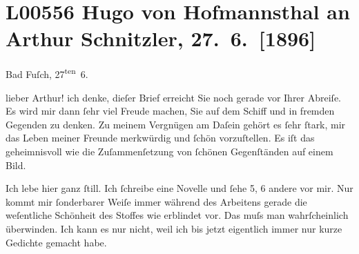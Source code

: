 

\section[Hugo von Hofmannsthal an Arthur Schnitzler, 27. 6. {[}1896{]}]{L00556 Hugo von Hofmannsthal an Arthur Schnitzler, 27. 6. {[}1896{]}}
\nopagebreak{}
\rehead{ }\normalsize\beginnumbering{}
\toendnotes[C]{\smallbreak\pagebreak[2]}
\toendnotes[C]{\smallbreak}
\pstart
           \raggedleft{}{\pb}Bad Fuſch, 27\textsuperscript{ten} 6.\pend
           
\pstart{}lieber Arthur!\pend\vspace{0.5em}
\pstart
           ich denke, dieſer Brief erreicht Sie noch gerade vor Ihrer Abreiſe. Es wird mir dann
               ſehr viel Freude machen, Sie auf dem Schiff und in fremden Gegenden zu denken. Zu
               meinem Vergnügen am Daſein gehört es ſehr ſtark, mir das Leben meiner Freunde
               merkwürdig und ſchön vorzuſtellen. Es iſt das geheimnis{\pb}voll wie die Zuſammenſetzung von
               ſchönen Gegenſtänden auf einem Bild.\pend
           
\pstart
           Ich lebe hier ganz ſtill. Ich ſchreibe eine Novelle und ſehe 5, 6 andere vor mir. Nur kommt mir
               ſonderbarer Weiſe immer während des Arbeitens gerade die weſentliche Schönheit des
               Stoffes wie erblindet vor. Das muſs man wahrſcheinlich überwinden. Ich kann es nur
               nicht, weil ich bis jetzt eigentlich immer nur {\pb}kurze Gedichte gemacht habe.\pend
           
